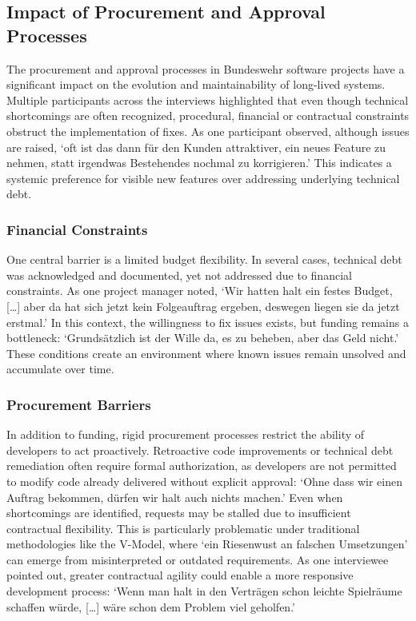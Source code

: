 \subsection{Impact of Procurement and Approval Processes}
The procurement and approval processes in Bundeswehr software projects have a significant impact on the evolution and maintainability of long-lived systems. Multiple participants across the interviews highlighted that even though technical shortcomings are often recognized, 
procedural, financial or contractual constraints obstruct the implementation of fixes. As one participant observed, although issues are raised, `oft ist das dann für den Kunden attraktiver, ein neues Feature zu nehmen, statt irgendwas Bestehendes nochmal zu korrigieren.'
This indicates a systemic preference for visible new features over addressing underlying technical debt.

\subsubsection{Financial Constraints}
One central barrier is a limited budget flexibility. In several cases, technical debt was acknowledged and documented, yet not addressed due to financial constraints. As one project manager noted, `Wir hatten halt ein festes Budget, [\ldots] aber da hat sich jetzt kein Folgeauftrag ergeben, deswegen liegen sie da jetzt erstmal.'
In this context, the willingness to fix issues exists, but funding remains a bottleneck: `Grundsätzlich ist der Wille da, es zu beheben, aber das Geld nicht.' These conditions create an environment where known issues remain unsolved and accumulate over time.

\subsubsection{Procurement Barriers}
In addition to funding, rigid procurement processes restrict the ability of developers to act proactively. Retroactive code improvements or technical debt remediation often require formal authorization, as developers are not permitted to modify code already delivered without explicit approval:
`Ohne dass wir einen Auftrag bekommen, dürfen wir halt auch nichts machen.' Even when shortcomings are identified, requests may be stalled due to insufficient contractual flexibility. This is particularly problematic under traditional methodologies like the V-Model, where
`ein Riesenwust an falschen Umsetzungen' can emerge from misinterpreted or outdated requirements. As one interviewee pointed out, greater contractual agility could enable a more responsive development process:
`Wenn man halt in den Verträgen schon leichte Spielräume schaffen würde, [\ldots] wäre schon dem Problem viel geholfen.'\\

